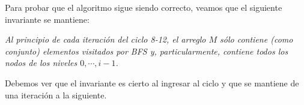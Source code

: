 \begin{algorithm}
	\dontprintsemicolon
 	\BlankLine
\caption{$\textsc{Vectorized-BFS-No-Branching}$}
\label{algo:algoritmo17}
\end{algorithm}

Para probar que el algoritmo sigue siendo correcto, veamos que el siguiente invariante se mantiene:

\begin{center}
\emph{
	Al principio de cada iteración del ciclo 8-12, el arreglo $M$ sólo contiene (como conjunto) elementos visitados por BFS y, particularmente, contiene todos los nodos de los niveles $0, \cdots, i - 1$.
}
\end{center}

Debemos ver que el invariante es cierto al ingresar al ciclo y que se mantiene de una iteración a la siguiente.

